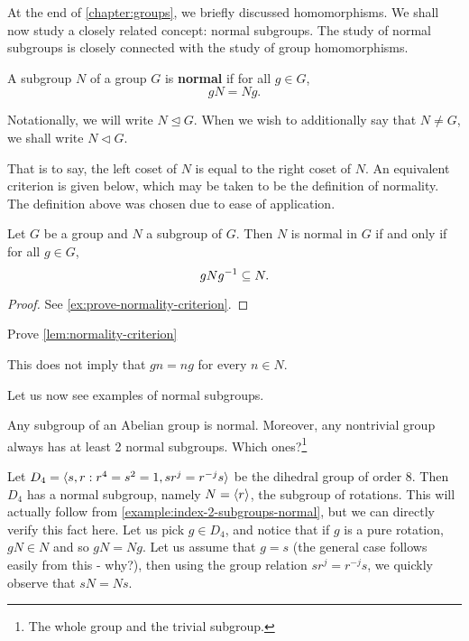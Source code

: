 \documentclass[./main.tex]{subfiles}
\begin{document}
At the end of \cref{chapter:groups}, we briefly discussed homomorphisms. We
shall now study a closely related concept: normal subgroups. The study of normal
subgroups is closely connected with the study of group homomorphisms.


\begin{definition}
\label{def:normal-subgroup}
    A subgroup $N$ of a group $G$ is \textbf{normal} if for all $g \in G$,
    \[
        gN = Ng.
    \]

    Notationally, we will write $N \unlhd G$. When we wish to additionally say
    that $N \neq G$, we shall write $N \vartriangleleft G$.
\end{definition}
That is to say, the left coset of $N$ is equal to the right coset of $N$. An
equivalent criterion is given below, which may be taken to be the definition of
normality. The definition above was chosen due to ease of application.
\begin{lemma}
\label{lem:normality-criterion}
    Let $G$ be a group and $N$ a subgroup of $G$. Then $N$ is normal in $G$ if
    and only if for all $g \in G$, 
    \[
        gNg^{-1} \subseteq N.
    \]
\end{lemma}
\begin{proof}
    See \cref{ex:prove-normality-criterion}.
\end{proof}

\begin{exercise}
\label{ex:prove-normality-criterion}
    Prove \cref{lem:normality-criterion}
\end{exercise}

\begin{warning}
    This does not imply that $gn = ng$ for every $n \in N$.
\end{warning}

Let us now see examples of normal subgroups.

\begin{example}
    Any subgroup of an Abelian group is normal. Moreover, any nontrivial group
    always has at least 2 normal subgroups. Which ones?\footnote{The whole group
    and the trivial subgroup.}
\end{example}

\begin{example}
    Let $D_4 = { \langle s, r : r^4=s^2=1, sr^j = r^{-j}s \rangle }$ be the dihedral group of
    order 8. Then $D_4$ has a normal subgroup, namely $N = { \langle r \rangle }$, the
    subgroup of rotations. This will actually follow from
    \cref{example:index-2-subgroups-normal}, but we can directly verify this
    fact here. Let us pick $g \in D_4$, and notice that if $g$ is a pure
    rotation, $gN \in N$ and so $gN = Ng$. Let us assume that $g = s$ (the
    general case follows easily from this - why?), then using the group relation
    $sr^j = r^{-j}s$, we quickly observe that $sN = Ns$.
\end{example}
\end{document}
